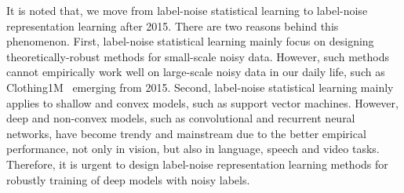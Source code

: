 It is noted that, we move from label-noise statistical learning to label-noise representation learning after 2015. There are two reasons behind this phenomenon. First, label-noise statistical learning mainly focus on designing theoretically-robust methods for small-scale noisy data. However, such methods cannot empirically work well on large-scale noisy data in our daily life, such as Clothing1M~ emerging from 2015. Second, label-noise statistical learning mainly applies to shallow and convex models, such as support vector machines. However, deep and non-convex models, such as convolutional and recurrent neural networks, have become trendy and mainstream due to the better empirical performance, not only in vision, but also in language, speech and video tasks. Therefore, it is urgent to design label-noise representation learning methods for robustly training of deep models with noisy labels.

